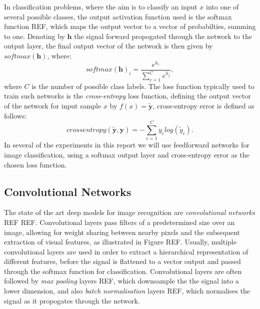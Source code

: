 In classification problems, where the aim is to classify an input $x$ into one of several possible classes, the output activation function used is the softmax function REF, which maps the output vector to a vector of probabilties, summing to one. Denoting by $\mathbf{h}$ the signal forward propogated through the network to the output layer, the final output vector of the network is then given by $softmax(\mathbf{h})$, where:
\begin{equation}
softmax(\mathbf{h})_i = \frac{e^{h_i}}{\sum_{c=1}^Ce^{h_j}},
\end{equation}
where $C$ is the number of possible class labels. The loss function typically used to train such networks is the \textit{cross-entropy} loss function, defining the output vector of the network for input sample $x$ by $f(x) = \tilde{\mathbf{y}}$, cross-entropy error is defined as follows:
\begin{equation}
cross entropy(\tilde{\mathbf{y}},\mathbf{y}) = - \sum_{c=1}^{C} y_{c} log(\tilde{y}_{c}).
\end{equation}
In several of the experiments in this report we will use feedforward networks for image classification, using a softmax output layer and cross-entropy error as the chosen loss function. 

\subsection{Convolutional Networks}\label{sec:convnets}
The state of the art deep models for image recognition are \textit{convolutional networks} REF REF. Convolutional layers pass filters of a predetermined size over an image, allowing for weight sharing between nearby pixels and the subsequent extraction of visual features, as illustrated in Figure REF. Usually, multiple convolutional layers are used in order to extract a hierarchical representation of different features, before the signal is flattened to a vector output and passed through the softmax function for classification. Convolutional layers are often followed by \textit{max pooling} layers REF, which downsample the the signal into a lower dimension, and also \textit{batch normalisation} layers REF, which normalises the signal as it propogates through the network. 

